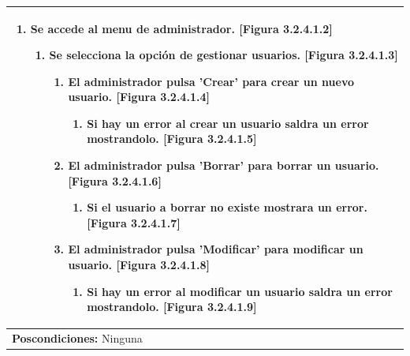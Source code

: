 \documentclass{report}
\begin{document}
\begin{center}
\begin{longtable}{|p{\linewidth}|}
                            \begin{enumerate}
                                \item Se accede al menu de administrador. [Figura 3.2.4.1.2]
                                \begin{enumerate}
                                    \item Se selecciona la opción de gestionar usuarios. [Figura 3.2.4.1.3]
                                    \begin{enumerate}
                                        \item El administrador pulsa 'Crear' para crear un nuevo usuario. [Figura 3.2.4.1.4]
                                        \begin{enumerate}
                                            \item Si hay un error al crear un usuario saldra un error mostrandolo. [Figura 3.2.4.1.5]
                                        \end{enumerate}
                                        \item El administrador pulsa 'Borrar' para borrar un usuario. [Figura 3.2.4.1.6]
                                        \begin{enumerate}
                                            \item Si el usuario a borrar no existe mostrara un error. [Figura 3.2.4.1.7]
                                        \end{enumerate}
                                        \item El administrador pulsa 'Modificar' para modificar un usuario. [Figura 3.2.4.1.8]
                                        \begin{enumerate}
                                            \item Si hay un error al modificar un usuario saldra un error mostrandolo. [Figura 3.2.4.1.9]
                                        \end{enumerate}
                                    \end{enumerate}
                                \end{enumerate} 
                            \end{enumerate}\\
                            \hline
                            \textbf{Poscondiciones:} Ninguna\\
                            \hline

\end{longtable}
\end{center}
\end{document}
